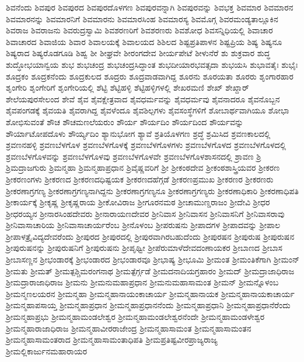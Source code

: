 {ಶಿವನೆಂದು
ಶಿವಪುರ
ಶಿವಪುರದ
ಶಿವಪುರದೊಳಗಣ
ಶಿವಪುರವನ್ನಾಗಿ
ಶಿವಪುರವನ್ನು
ಶಿವಭಕ್ತ
ಶಿವಮಾರ
ಶಿವಮಾರನ
ಶಿವಮಾರನನ್ನು
ಶಿವಮಾರನಿಗೆ
ಶಿವಮಾರನು
ಶಿವಮಾರಸಿಂಹ
ಶಿವಮಾರಸ್ಯ
ಶಿವಮೊಗ್ಗ
ಶಿವರಮಂಡ್ಯತಾಲ್ಲೂಕಿನ
ಶಿವರಾಜ
ಶಿವರಾಜನು
ಶಿವರುದ್ರಸ್ವಾಮಿ
ಶಿವಶರಣರಿಗೆ
ಶಿವಶರಣರು
ಶಿವಶೋಧ
ಶಿವಸನ್ನಿಧಿಯಲ್ಲಿ
ಶಿವಾಚಾರ
ಶಿವಾಚಾರದ
ಶಿವಾಜಿಯ
ಶಿವಾರ
ಶಿವಾಲಯಕ್ಕೆ
ಶಿವಾಲಯದ
ಶಿಶಿಲದ
ಶಿಷ್ಟಪ್ರತಿಪಾಳನ
ಶಿಷ್ಟಪ್ರಿಯ
ಶಿಷ್ಯ
ಶಿಷ್ಯನೂ
ಶಿಷ್ಯರಾದ
ಶಿಷ್ಯರೊಡಗೂಡಿ
ಶಿಹ್ವ
ಶೀ
ಶೀಘ್ರವೇ
ಶೀರಂಗದೇವ
ಶೀರ್ಯಪೇಟೆ
ಶೀಳುನೆರೆ
ಶು
ಶುಕ್ರವಾರ
ಶುದ್ಧ
ಶುದ್ಧೋಭಯಾನ್ವಯ
ಶುಭ
ಶುಭಚಂದ್ರ
ಶುಭಚಂದ್ರಸಿದ್ಧಾಂತ
ಶುಭದೀಯಾರಭವತ್ಸದಾ
ಶುಭಯಸಿ
ಶುಭಾವತೈಃ
ಶುಭೈಃ
ಶೂದ್ರಕಂ
ಶೂದ್ರಕನೆಂದು
ಶೂದ್ರಕುಲದ
ಶೂದ್ರರು
ಶೂದ್ರವಾಡವಾಗಿದ್ದ
ಶೂರನು
ಶೂರಯತಾ
ಶೂರರು
ಶೃಂಗಾರಹಾರ
ಶೃಂಗೇರಿ
ಶೃಂಗೇರಿಗೆ
ಶೃಂಗೇರಿಯಲ್ಲಿ
ಶೆಟ್ಟಿ
ಶೆಟ್ಟಿಹಳ್ಳಿ
ಶೆಟ್ಟಿಹಳ್ಳಿಗಳಲ್ಲಿ
ಶೇಖರಮಣಿ
ಶೇಖ್
ಶೇಖ್ದಾರ್
ಶೇಲೆಯಪುರಸೇಲಂದ
ಶೇವೆ
ಶೈವ
ಶೈವಕ್ಷೇತ್ರವಾದ
ಶೈವಧರ್ಮವನ್ನು
ಶೈವಧರ್ಮವು
ಶೈವನಾದರೂ
ಶೈವನೊಬ್ಬನ
ಶೈವಪಂಗಡಕ್ಕೆ
ಶೈವಯತಿ
ಶೈವರಾಗಿದ್ದ
ಶೈವಳೆಂದೂ
ಶೈವಶಿಲ್ಪಗಳು
ಶೈವಸಂಸ್ಥೆಗಳಿಗೆ
ಶೋಬಾರ್ಥವಾಗಿಯೂ
ಶೋಭಾ
ಶೋಭಿಸುವಂತೆ
ಶೌಚ
ಶೌಚಮಣಲೆಯರುಂ
ಶೌರ್ಯ
ಶೌರ್ಯದಿಂ
ಶೌರ್ಯದಿಂದ
ಶೌರ್ಯವನ್ನು
ಶೌರ್ಯಾಟೋಪದೊಳು
ಶೌರ್ಯ್ಯದಿಂ
ಶ್ಯಾನುಭೋಗ
ಶ್ಯಾವೆ
ಶ್ರತಿಯೊಳಗಣ
ಶ್ರದ್ಧೆ
ಶ್ರಮಿಸಿದ
ಶ್ರವಣಕಾಲದಲ್ಲಿ
ಶ್ರವಣನಹಳ್ಳಿ
ಶ್ರವಣಬೆಳಗೊಳ
ಶ್ರವಣಬೆಳಗೊಳಕ್ಕೆ
ಶ್ರವಣಬೆಳಗೊಳಗಳು
ಶ್ರವಣಬೆಳಗೊಳದ
ಶ್ರವಣಬೆಳಗೊಳದಲ್ಲಿ
ಶ್ರವಣಬೆಳಗೊಳವನ್ನು
ಶ್ರವಣಬೆಳಗೊಳವು
ಶ್ರವಣಬೆಳಗೊಳವೇ
ಶ್ರವಣಬೆಳಗೊಳಶಾಸನದಲ್ಲಿ
ಶ್ರಾವಣ
ಶ್ರಿ
ಶ್ರಿಮದ್ರಾಜಗುರು
ಶ್ರಿಮನ್ಮಹಾ
ಶ್ರಿಮನ್ಮಹಾಪ್ರಧಾನ
ಶ್ರಿವೈಷ್ಣವರಿಗೆ
ಶ್ರೀ
ಶ್ರೀಕಂಠದೇವ
ಶ್ರೀಕಂಠಶಾಸ್ತ್ರಿಯವರ
ಶ್ರೀಕರಣ
ಶ್ರೀಕರಣಂಗಳು
ಶ್ರೀಕರಣದ
ಶ್ರೀಕರಣದಧಿಷ್ಟಯಕ
ಶ್ರೀಕರಣದಹೆಗ್ಗಡೆ
ಶ್ರೀಕರಣಪ್ರಮುಖ
ಶ್ರೀಕರಣರ
ಶ್ರೀಕರಣರು
ಶ್ರೀಕರಣಾಗ್ರಗಣ್ಯ
ಶ್ರೀಕರಣಾಗ್ರಗಣ್ಯನಾಗಿದ್ದನು
ಶ್ರೀಕರಣಾಗ್ರಗಣ್ಯನೂ
ಶ್ರೀಕರಣಾಗ್ರಗಣ್ಯರು
ಶ್ರೀಕರಣಾಧಿಕಾರಿ
ಶ್ರೀಕರಣಾಧಿಪತಿ
ಶ್ರೀಕಾರ್ಯಕ್ಕೆ
ಶ್ರೀಕೃಷ್ಣ
ಶ್ರೀಕೃಷ್ಣರಾಯ
ಶ್ರೀಕೋವಿರಾಜ
ಶ್ರೀಗೂರನಮಠ
ಶ್ರೀಚಾಮುಣ್ಡರಾಜಂ
ಶ್ರೀದೇವಿ
ಶ್ರೀಧರ
ಶ್ರೀಧರಯ್ಯನ
ಶ್ರೀನಾರಸಿಂಹದೇವರು
ಶ್ರೀನಾರಾಯಣದೇವರ
ಶ್ರೀನಿವಾಸ
ಶ್ರೀನಿವಾಸನ
ಶ್ರೀನಿವಾಸನಿಗೆ
ಶ್ರೀನಿವಾಸರಾವು
ಶ್ರೀನಿವಾಸಾಚಾರಿಯ
ಶ್ರೀನಿವಾಸಾಚಾರ್ಯರೆಂಬ
ಶ್ರೀನೊಳಂಬ
ಶ್ರೀಪರುಷನು
ಶ್ರೀಪಾದಗಳ
ಶ್ರೀಪಾದವನ್ನು
ಶ್ರೀಪಾಲ
ಶ್ರೀಪಾಳತ್ರೈವಿದ್ಯದೇವರೆಂದು
ಶ್ರೀಪುರದ
ಶ್ರೀಪುರದಲ್ಲಿ
ಶ್ರೀಪುರವಾಗಿರಬಹುದೆಂದು
ಶ್ರೀಪುರಷನ
ಶ್ರೀಪುರುಷ
ಶ್ರೀಪುರುಷನ
ಶ್ರೀಪುರುಷನನ್ನು
ಶ್ರೀಪುರುಷನಿಗೆ
ಶ್ರೀಪುರುಷನು
ಶ್ರೀಪೃಥ್ವೀ
ಶ್ರೀಪೆರುಮಾಳೆದೇವದಂಣಾಯಕರ
ಶ್ರೀಬಾಣದ
ಶ್ರೀಬಾಸ
ಶ್ರೀಬಾಸಣ್ಣನ
ಶ್ರೀಭಂಡಾರಕ್ಕೆ
ಶ್ರೀಭಂಡಾರದ
ಶ್ರೀಭಂಡಾರವೂ
ಶ್ರೀಭಾಷ್ಯ
ಶ್ರೀಭೂಮಿ
ಶ್ರೀಮಂತ
ಶ್ರೀಮಂತಿಕೆಗಾಗಿ
ಶ್ರೀಮಂನ್
ಶ್ರೀಮತು
ಶ್ರೀಮತ್
ಶ್ರೀಮತ್ಪಶ್ಚಿಮರಂಗನಾಥ
ಶ್ರೀಮತ್ಪೆರ್ಗ್ಗಡೆ
ಶ್ರೀಮದನಾದಿಯಗ್ರಹಾರಂ
ಶ್ರೀಮದ್
ಶ್ರೀಮದ್ರಾಜಾಧಿರಾಜ
ಶ್ರೀಮದ್ರಾರಾಜಾಧಿರಾಜ
ಶ್ರೀಮನು
ಶ್ರೀಮನುಮಹಾಪ್ರಧಾನ
ಶ್ರೀಮನುಮಹಾಸಾಮಂತ
ಶ್ರೀಮನ್
ಶ್ರೀಮನ್ನೊಳಂಬ
ಶ್ರೀಮನ್ಮಣಲಯರನ
ಶ್ರೀಮನ್ಮಹಾ
ಶ್ರೀಮನ್ಮಹಾನಾಯಂಕಾಚಾರ್ಯ
ಶ್ರೀಮನ್ಮಹಾನಾಯಕ
ಶ್ರೀಮನ್ಮಹಾನಾಯಕಾಚಾರ್ಯ
ಶ್ರೀಮನ್ಮಹಾಪಸಾಯ್ತ
ಶ್ರೀಮನ್ಮಹಾಪ್ರಧಾನ
ಶ್ರೀಮನ್ಮಹಾಪ್ರಧಾನನೆಂದು
ಶ್ರೀಮನ್ಮಹಾಪ್ರಧಾನಿ
ಶ್ರೀಮನ್ಮಹಾಪ್ರಧಾನೆರೆಂದು
ಶ್ರೀಮನ್ಮಹಾಪ್ರಭು
ಶ್ರೀಮನ್ಮಹಾಮಂಡಲೇಶ್ವರ
ಶ್ರೀಮನ್ಮಹಾಮಂಡಲೇಶ್ವರನೆಂದೇ
ಶ್ರೀಮನ್ಮಹಾಮಂಡಳೇಶ್ವರ
ಶ್ರೀಮನ್ಮಹಾರಾಜಾಧಿರಾಜ
ಶ್ರೀಮನ್ಮಹಾವೀರರಾಜೇಂದ್ರ
ಶ್ರೀಮನ್ಮಹಾಸಾಮಂತ
ಶ್ರೀಮನ್ಮಹಾಸಾಮಂತನ
ಶ್ರೀಮನ್ಮಹಾಸಾಮಂತರಾದ
ಶ್ರೀಮನ್ಮಹಾಸಾಮಂತಾಧಿಪತಿ
ಶ್ರೀಮಪ್ರತಿಷ್ಟವೀರಪ್ರಾಜ್ಯರಾಜ್ಯ
ಶ್ರೀಮಲ್ಲಿಕಾರ್ಜುನಮಹಾರಾಯರ
}
